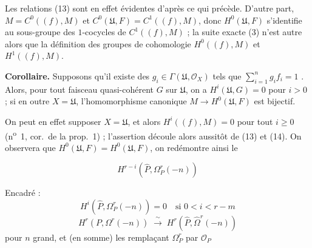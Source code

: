\documentclass[11pt,a4paper]{article}
\begin{document}

Les relations (13) sont en effet évidentes d'après ce qui précède. D'autre part,
\struck{\ill{}} $M = C^{0}((f), M)$ et $C^{0}(\mathfrak{U}, F) = C^{1}((f), M)$,
donc $H^{0}(\mathfrak{U}, F)$ s'identifie au sous-groupe des $1$-cocycles de
$C^{1}((f), M)$ ; la suite exacte (3) n'est autre alors que
 la définition des groupes de cohomologie
$H^{0}((f), M)$ et $H^{1}((f), M)$.

\textbf{Corollaire.} Supposons qu'il existe des
$g_{i} \in \Gamma(\mathfrak{U}, \mathcal{O}_{X})$ tels que
$\sum_{i=1}^{n} g_{i} f_{i} = 1$ . Alors, pour
tout faisceau quasi-cohérent $G$ sur $\mathfrak{U}$, on a
$H^{i}(\mathfrak{U}, G) = 0$ pour $i > 0$ ; si en outre $X = \mathfrak{U}$,
l'homomorphisme canonique $M \to H^{0}(\mathfrak{U}, F)$ est bijectif.

On peut en effet supposer $X = \mathfrak{U}$, et alors $H^{i}((f), M) = 0$ pour
tout $i \geqslant 0$ (n\textsuperscript{o}~1, cor.\ de la prop.~1) ; l'assertion
découle alors aussitôt de (13) et (14). On observera que 
$H^{0}(\mathfrak{U}, F) = H^{0}(\mathfrak{U}, F)$, on redémontre ainsi le \ill{}




\[
  H^{r-i}\!\left(\hat{P}, \Omega^{r}_{P}(-n)\right)
\]

 \quad {}

Encadré :
\[
  H^{i}\!\left(\hat{P}, \Omega^{r}_{P}(-n)\right) = 0 \quad \text{si } 0 < i < r-m
\]
\[
  H^{r}\!\left(P, \Omega^{r}(-n)\right) \;\xrightarrow{\ \sim\ }\;
  H^{r}\!\left(\hat{P}, \hat{\Omega}^{r}(-n)\right)
\]
pour $n$ grand, \ill{} et \ill{} (en somme) les \ill{} \ill{} remplaçant
$\Omega^{r}_{P}$ par $\mathcal{O}_{P}$ \ill{}

\end{document}
